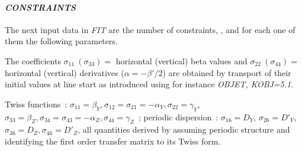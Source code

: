 \smallskip

\paragraph{\textit{CONSTRAINTS}} 

\noindent The next input data in \textsl{FIT} are the number of constraints,
\textsl{\NC}, and for each one of them the following parameters.

\smallskip


 The coefficients 
$ \sigma_{11}~(\sigma_{ 33}) = $ horizontal (vertical) beta values and 
$ \sigma_{ 22}~(\sigma_{ 44}) = $ horizontal (vertical) derivatives ($\alpha = -\beta'/2$) 
are obtained by transport of their initial values at line start as introduced using for instance  
\textsl{OBJET, KOBJ=5.1}.\\

\smallskip

 Twiss functions~: $\sigma_{11}=\beta_Y, \sigma_{12}=\sigma_{21}=-\alpha_Y, 
\sigma_{22}=\gamma_Y$, $\sigma_{33}=\beta_Z, \sigma_{34}=\sigma_{43}=-\alpha_Z, \sigma_{44}=\gamma_Z$~; periodic dispersion~: 
$\sigma_{16}=D_Y$, $\sigma_{26}=D'_Y$,  $\sigma_{36}=D_Z, \sigma_{46}=D'_Z$, all quantities derived by assuming 
 periodic structure and identifying the first order transfer matrix to its Twiss form. 



